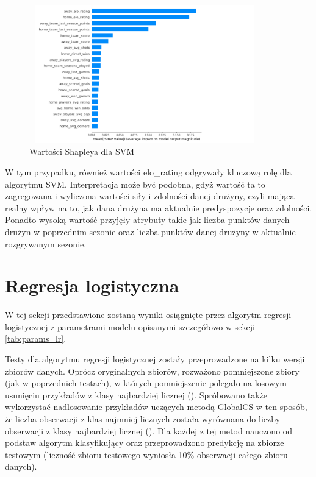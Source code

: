 \begin{figure}[H] 
        \centering\includegraphics[width=10cm,height=6cm]{figures/ShapSVM.png}
        \caption{Wartości Shapleya dla SVM}\label{Shap-SVM}
\end{figure}
W tym przypadku, również wartości elo\_rating odgrywały kluczową rolę dla algorytmu SVM. Interpretacja może być podobna, gdyż wartość ta to zagregowana i wyliczona wartości siły i zdolności danej drużyny, czyli mająca realny wpływ na to, jak dana drużyna ma aktualnie predyspozycje oraz zdolności. Ponadto wysoką wartość przyjęły atrybuty takie jak liczba punktów danych drużyn w poprzednim sezonie oraz liczba punktów danej drużyny w aktualnie rozgrywanym sezonie. 


\section{Regresja logistyczna}
\noindent W tej sekcji przedstawione zostaną wyniki osiągnięte przez algorytm regresji logistycznej z parametrami modelu opisanymi szczegółowo w sekcji \ref{tab:params_lr}.

Testy dla algorytmu regresji logistycznej zostały przeprowadzone na kilku wersji zbiorów danych. Oprócz  oryginalnych zbiorów, rozważono pomniejszone zbiory (jak w poprzednich testach), w których pomniejszenie polegało na losowym usunięciu przykładów z klasy najbardziej licznej (). Spróbowano także wykorzystać nadlosowanie przykładów uczących metodą GlobalCS w ten sposób, że liczba obserwacji z klas najmniej licznych została wyrównana do liczby obserwacji z klasy najbardziej licznej (). Dla każdej z tej metod nauczono od podstaw algorytm klasyfikujący oraz przeprowadzono predykcję na zbiorze testowym (liczność zbioru testowego wyniosła 10\% obserwacji całego zbioru danych).

